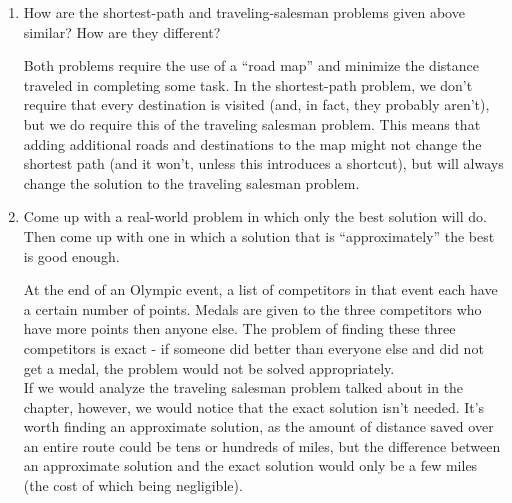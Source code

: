 \documentclass[Chapter01]{subfiles}
\begin{document}
\begin{enumerate}[leftmargin=\labelsep]
		\item How are the shortest-path and traveling-salesman problems given above similar? How are they different?
		\begin{answer}
			Both problems require the use of a ``road map'' and minimize the distance traveled in completing some task. In the shortest-path problem, we don't require that every destination is visited (and, in fact, they probably aren't), but we do require this of the traveling salesman problem. This means that adding additional roads and destinations to the map might not change the shortest path (and it won't, unless this introduces a shortcut), but will always change the solution to the traveling salesman problem.
		\end{answer}

		\item Come up with a real-world problem in which only the best solution will do. Then come up with one in which a solution that is ``approximately'' the best is good enough.
		\begin{answer}
			At the end of an Olympic event, a list of competitors in that event each have a certain number of points. Medals are given to the three competitors who have more points then anyone else. The problem of finding these three competitors is exact - if someone did better than everyone else and did not get a medal, the problem would not be solved appropriately.\\
			\hfill
			If we would analyze the traveling salesman problem talked about in the chapter, however, we would notice that the exact solution isn't needed. It's worth finding an approximate solution, as the amount of distance saved over an entire route could be tens or hundreds of miles, but the difference between an approximate solution and the exact solution would only be a few miles (the cost of which being negligible).
		\end{answer}
	\end{enumerate}
\end{document}
